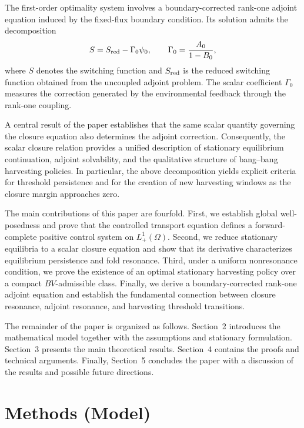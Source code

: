 \documentclass[a4paper,fleqn,longmktitle]{cas-sc}
\theoremstyle{plain}
\theoremstyle{definition}
\theoremstyle{remark}
\numberwithin{equation}{section}
\begin{document}
The first-order optimality system involves a boundary-corrected rank-one
adjoint equation induced by the fixed-flux boundary condition. Its solution
admits the decomposition
\[
S
=
S_{\rm red}
-
\Gamma_0\psi_0,
\qquad
\Gamma_0
=
\frac{A_0}{1-B_0},
\]
where \(S\) denotes the switching function and
\(S_{\rm red}\) is the reduced switching function obtained from the uncoupled
adjoint problem. The scalar coefficient \(\Gamma_0\) measures the correction
generated by the environmental feedback through the rank-one coupling.

A central result of the paper establishes that the same scalar quantity
governing the closure equation also determines the adjoint correction.
Consequently, the scalar closure relation provides a unified description of
stationary equilibrium continuation, adjoint solvability, and the qualitative
structure of bang--bang harvesting policies. In particular, the above
decomposition yields explicit criteria for threshold persistence and for the
creation of new harvesting windows as the closure margin approaches zero.

The main contributions of this paper are fourfold. First, we establish global
well-posedness and prove that the controlled transport equation defines a
forward-complete positive control system on \(L^1_+(\Omega)\). Second, we
reduce stationary equilibria to a scalar closure equation and show that its
derivative characterizes equilibrium persistence and fold resonance. Third,
under a uniform nonresonance condition, we prove the existence of an optimal
stationary harvesting policy over a compact \(BV\)-admissible class. Finally,
we derive a boundary-corrected rank-one adjoint equation and establish the
fundamental connection between closure resonance, adjoint resonance, and
harvesting threshold transitions.

The remainder of the paper is organized as follows. Section~2 introduces the
mathematical model together with the assumptions and stationary formulation.
Section~3 presents the main theoretical results. Section~4 contains the proofs
and technical arguments. Finally, Section~5 concludes the paper with a
discussion of the results and possible future directions.

\section{Methods (Model)}
\label{sec:model}
\end{document}
